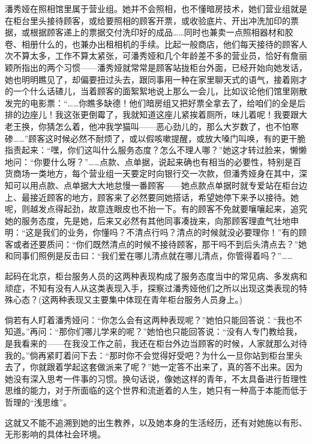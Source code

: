 \par 潘秀娅在照相馆里属于营业组。她并不会照相，也不懂暗房技术，她们营业组就是在柜台里头接待顾客，或给要照相的顾客开票，或收验底片、开出冲洗加印的票据，或根据顾客递上的票据交付洗印好的成品……同时也兼卖一点照相器材和胶卷、相册什么的，也兼办出租相机的手续。比起一般商店，他们每天接待的顾客人次不算太多，工作不算太紧张，可潘秀娅和几个年龄差不多的营业员，恰好有詹丽颖所指出的两个习惯——潘秀娅就常常是顾客站拢柜台外面，已经开始向她发话，她也明明瞧见了，却偏要扭过头去，跟同事用一种在家里聊天式的语气，接着刚才的一个什么话碴儿，当着顾客的面絮絮地说上那么一会儿，比如议论他们馆里刚散发完的电影票：“……你瞧多缺德！他们暗房组又把好票全拿去了，给咱们的全是后排的边座儿！我这张更倒霉了，我就知道这座儿紧挨着厕所，味儿着呢！我要跟大老王换，你猜怎么着，他冲我学猫叫——恶心劲儿的，那么大岁数了，也不怕寒碜……”顾客这时候必然不耐烦了，或以假咳嗽提醒，或放大嗓门叫唤，有的更干脆指责起来：“嘿，你们这叫什么服务态度？怎么不理人哪？”她这才转过脸来，懒懒地问：“你要什么呀？”……点款、点单据，说起来确也有相当的必要性，特别是百货商场一类地方，每个营业组一天要定时向银行交一次款，但潘秀娅身在其中，深知可以用点款、点单据大大地怠慢一番顾客——她点款点单据时就专爱站在柜台边上、最接近顾客的地方，顾客来了必然要同她搭话，希望她停下来予以接待。她呢，则越发点得起劲，故意连眼皮也不抬一下。有的顾客不免就要嚷嚷起来，追究她的服务态度，先是她，后来又必然有其他同事凑拢来，向那顾客理直气壮地申明：“这是我们的业务，你懂吗？不清点行吗？清点的时候就没必要理你！”有的顾客或者还要质问：“你们既然清点的时候不接待顾客，那干吗不到后头清点去？”她和同事们照例是反击曰：“我们爱在哪儿清点就在哪儿清点，你管得着吗？”……
\par 起码在北京，柜台服务人员的这两种表现构成了服务态度当中的常见病、多发病和顽症，不知有没有人从这类表现入手，探察过潘秀娅他们之所以出现这类表现的特殊心态？(这两种表现又主要集中体现在青年柜台服务人员身上。)
\par 倘若有人盯着潘秀娅问：“你怎么会有这两种表现呢？”她怕只能回答说：“我也不知道。”再问：“那你们哪儿学来的呢？”她怕也只能回答说：“没有人专门教给我，是我看来的——在我没工作之前，我还在柜台外边当顾客的时候，人家就那么对待我的。”倘再紧盯着问下去：“那时你不会觉得好受吧？为什么一旦你站到柜台里头去了，你就跟着学起这套做派来了呢？”她一定答不出来了，真的答不出来。因为她没有深入思考一件事的习惯。换句话说，像她这样的青年，不太具备进行哲理性思维的能力，对于所面临的这个世界和流逝着的人生，她只有一种高于本能而低于哲理的“浅思维”。
\par 这就又不能不追溯到她的出生教养，以及她本身的生活经历，还有对她施以有形、无形影响的具体社会环境。
